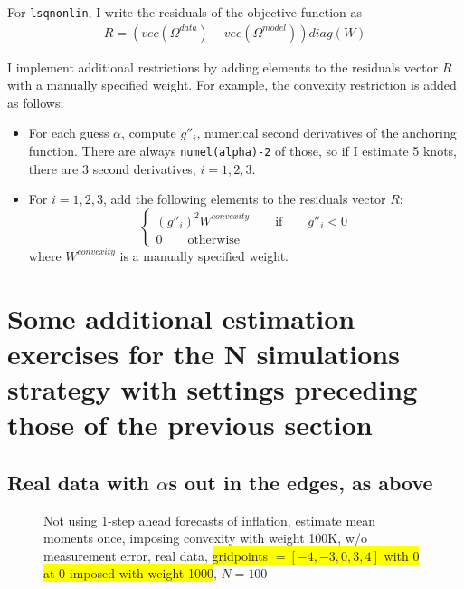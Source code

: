 \documentclass[11pt]{article}
\def \myFigPath {../../figures/}
\renewcommand{\[}{\begin{equation}}
\renewcommand{\]}{\end{equation}}
\begin{document}
For \texttt{lsqnonlin}, I write the residuals of the objective function as
\begin{align}
R = (vec(\Omega^{data}) - vec(\Omega^{model})) diag(W)
\end{align}

I implement additional restrictions by adding elements to the residuals vector $R$ with a manually specified weight. For example, the convexity restriction is added as follows:
\begin{itemize}
\item For each guess $\alpha$, compute $g''_i$, numerical second derivatives of the anchoring function. There are always \texttt{numel(alpha)-2} of those, so if I estimate 5 knots, there are 3 second derivatives, $i=1,2,3$. 
\item For $i=1,2,3$, add the following elements to the residuals vector $R$: 
\begin{equation}
\begin{cases} (g''_i)^2 W^{convexity} \quad \quad \text{if} \quad \quad g''_i < 0 \\
0  \quad \quad \text{otherwise} \end{cases}
\end{equation}
where $W^{convexity}$ is a manually specified weight.
\end{itemize}












\clearpage
\section{Some additional estimation exercises for the N simulations strategy with settings preceding those of the previous section}

\subsection{Real data with $\alpha$s out in the edges, as above}
\begin{figure}[h!]
\caption{Not using 1-step ahead forecasts of inflation, estimate mean moments once, imposing convexity with weight 100K, w/o measurement error, real data, \colorbox{yellow}{gridpoints $= [-4,-3,0,3,4]$ with 0 at 0 imposed with weight 1000}, $N=100$}
\end{figure}
\end{document}
